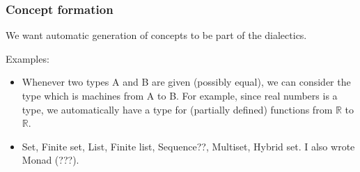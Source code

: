 \subsubsection{Concept formation}

We want automatic generation of concepts to be part of the dialectics.

Examples:

\begin{itemize}
\item Whenever two types A and B are given (possibly equal), we can consider the type which is machines from A to B. For example, since real numbers is a type, we automatically have a type for (partially defined) functions from $\mathbb{R}$ to $\mathbb{R}$.
\item Set, Finite set, List, Finite list, Sequence??, Multiset, Hybrid set. I also wrote Monad (???).

\end{itemize}
